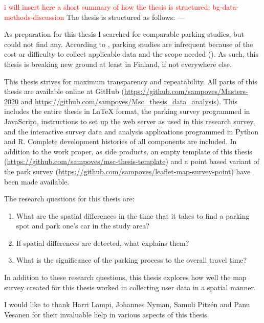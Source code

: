 \textcolor{red}{i will insert here a short summary of how the thesis is structured; bg-data-methods-discussion}
The thesis is structured as follows: ---

As preparation for this thesis I searched for comparable parking studies, but could not find any. According to \citeauthor{Diallo2015}, parking studies are infrequent because of the cost or difficulty to collect applicable data and the scope needed (\citeyear{Diallo2015}). As such, this thesis is breaking new ground at least in Finland, if not everywhere else.

This thesis strives for maximum transparency and repeatability. All parts of this thesis are available online at GitHub (\textcolor{blue}{\url{https://github.com/sampoves/Masters-2020}} and \textcolor{blue}{\url{https://github.com/sampoves/Msc_thesis_data_analysis}}). This includes the entire thesis in LaTeX format, the parking survey programmed in JavaScript, instructions to set up the web server as used in this research survey, and the interactive survey data and analysis applications programmed in Python and R. Complete development histories of all components are included. In addition to the work proper, as side products, an empty template of this thesis (\textcolor{blue}{\url{https://github.com/sampoves/msc-thesis-template}}) and a point based variant of the park survey (\textcolor{blue}{\url{https://github.com/sampoves/leaflet-map-survey-point}}) have been made available.

\bigskip
\noindent
The research questions for this thesis are:

\begin{spacing}{1}
    \begin{enumerate}[label=\Roman*]
      \item What are the spatial differences in the time that it takes to find a parking spot and park one’s car in the study area?
      \item If spatial differences are detected, what explains them?
      \item What is the significance of the parking process to the overall travel time?
    \end{enumerate}
\end{spacing}
\bigskip
In addition to these research questions, this thesis explores how well the map survey created for this thesis worked in collecting user data in a spatial manner.

I would like to thank Harri Lampi, Johannes Nyman, Samuli Pitzén and Panu Vesanen for their invaluable help in various aspects of this thesis.